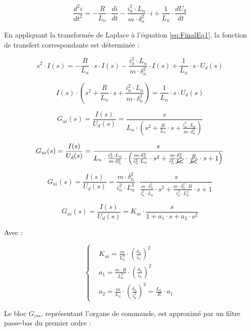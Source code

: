 \begin{equation}
    \frac{d^2i}{dt^2} = -\frac{R}{L_n} \cdot \frac{di}{dt} - \frac{i_n^2\cdot L_n}{m \cdot\delta_n^2}\cdot i + \frac{1}{L_n}\cdot \frac{dU_d}{dt}
    \label{eq:FinalEq1}
\end{equation}

En appliquant la transformée de Laplace à l'équation \ref{eq:FinalEq1}, la fonction de transfert correspondante est déterminée :

$$ s^2\cdot I(s) = -\frac{R}{L_n} \cdot s\cdot I(s) - \frac{i_n^2\cdot L_n}{m \cdot\delta_n^2}\cdot I(s) + \frac{1}{L_n}\cdot s\cdot U_d(s) $$

$$ I(s)\cdot \left( s^2 + \frac{R}{L_n} \cdot s + \frac{i_n^2\cdot L_n}{m \cdot\delta_n^2}\right) = \frac{1}{L_n}\cdot s\cdot U_d(s) $$

$$ G_{ui}(s) = \frac{I(s)}{U_d(s)} = \frac{s}{L_n\cdot \left( s^2 + \frac{R}{L_n} \cdot s + \frac{i_n^2\cdot L_n}{m \cdot\delta_n^2}\right)}$$

$$ G_{ui}(s) = \frac{I(s)}{U_d(s)} = \frac{s}{L_n\cdot\frac{i_n^2\cdot L_n}{m \cdot\delta_n^2}\cdot\left(\frac{m\cdot\delta_n^2}{i_n^2\cdot L_n}\cdot s^2 + \frac{m\cdot\delta_n^2}{i_n^2\cdot \cancel{L_n}}\cdot\frac{R}{\cancel{L_n}} \cdot s + 1 \right)}$$

$$ G_{ui}(s) = \frac{I(s)}{U_d(s)} = \frac{m \cdot\delta_n^2}{i_n^2\cdot L_n^2}\cdot\frac{s}{ \frac{m\cdot\delta_n^2}{i_n^2\cdot L_n}\cdot s^2 + \frac{m\cdot\delta_n^2\cdot R}{i_n^2\cdot L_n^2} \cdot s + 1}$$

\begin{equation}
    G_{ui}(s) = \frac{I(s)}{U_d(s)} = K_{ui}\cdot\frac{s}{1 + a_1 \cdot s + a_2\cdot s^2}
\end{equation}

Avec :

\begin{equation*}
    \left\{ \begin{aligned}
         & K_{ui} = \frac{m}{L_n^2}\cdot \left(\frac{\delta_n}{i_n} \right)^2                     \\
         & a_1 = \frac{m\cdot R}{L_n^2}\cdot \left(\frac{\delta_n}{i_n} \right)^2                 \\
         & a_2 = \frac{m}{L_n}\cdot\left(\frac{\delta_n}{i_n^2}\right)^2 = \frac{L_n}{R}\cdot a_1
    \end{aligned} \right.
\end{equation*}

Le bloc $G_{cm}$, représentant l'organe de commande, est approximé par un filtre passe-bas du premier ordre :

